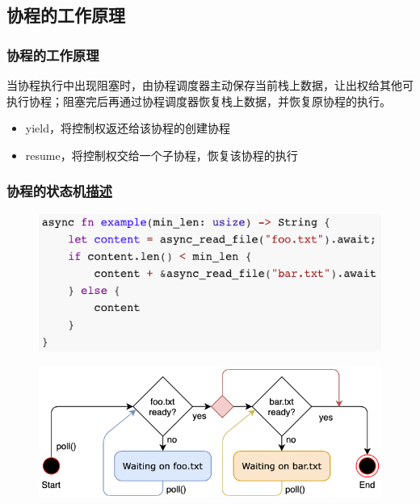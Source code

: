 \subsection{协程的工作原理}
% 
\begin{frame}[fragile]
    \frametitle{协程的工作原理}
% 
当协程执行中出现阻塞时，由协程调度器主动保存当前栈上数据，让出权给其他可执行协程；阻塞完后再通过协程调度器恢复栈上数据，并恢复原协程的执行。 \pause

    \begin{itemize}
        \item yield，将控制权返还给该协程的创建协程
        \item resume，将控制权交给一个子协程，恢复该协程的执行
    \end{itemize}

% 

\end{frame}
\begin{frame}[fragile]
    \frametitle{协程的状态机\href{https://os.phil-opp.com/async-await/\#the-async-await-pattern}{描述}}
% 
	\begin{figure}
		\centering
		\includegraphics[width=0.5\linewidth]{figs/Rust-fsm.png}
	\end{figure}


% 
	\begin{figure}
		\centering
		\includegraphics[width=0.6\linewidth]{figs/async-state-machine-basic.png}
    \end{figure}


% 
% 
% 

\end{frame}
